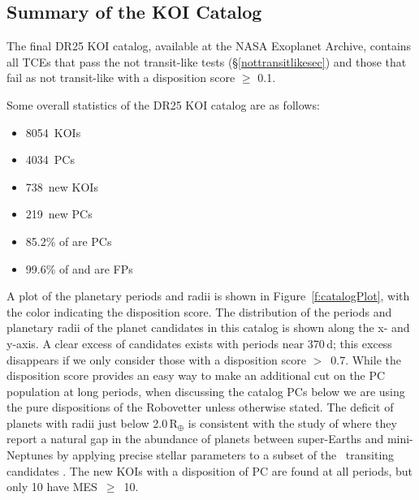 \def \nkois {8054}
\def \ncand {4034}
\def \newkois {738}
\def \newcand {219}
\def \completeness {85.2}
\def \reliability {97.1}
\def \effectiveness {99.6}
\label{s:summary}
\subsection{Summary of the KOI Catalog}
The final DR25 KOI catalog, available at the NASA Exoplanet Archive, contains all TCEs that pass the not transit-like tests (\S\ref{nottransitlikesec}) and those that fail as not transit-like with a disposition score $\ge$ 0.1. 


Some overall statistics of the DR25 KOI catalog are as follows:
\begin{itemize}
    \item \nkois{}~KOIs
    \item \ncand{}~PCs
    \item \newkois{}~new KOIs
    \item \newcand{}~new PCs
    \item \completeness{}\% of  are PCs
    \item \effectiveness{}\% of  and  are FPs
\end{itemize}

A plot of the planetary periods and radii is shown in Figure~\ref{f:catalogPlot}, with the color indicating the disposition score. The distribution of the periods and planetary radii of the planet candidates in this catalog is shown along the x- and y-axis. A clear excess of candidates exists with periods near 370\,d;  this excess disappears if we only consider those with a disposition score $>$~0.7. While the disposition score provides an easy way to make an additional cut on the PC population at long periods, when discussing the catalog PCs below we are using the pure dispositions of the Robovetter unless otherwise stated. The deficit of planets with radii just below 2.0\,R$_{\oplus}$ is consistent with the study of \citet{Fulton2017} where they report a natural gap in the abundance of planets between super-Earths and mini-Neptunes by applying precise stellar parameters to a subset of the \kepler\ transiting candidates \citep{CKS2,CKS1}. The new KOIs with a disposition of PC are found at all periods, but only 10 have MES~$\geq$~10.

